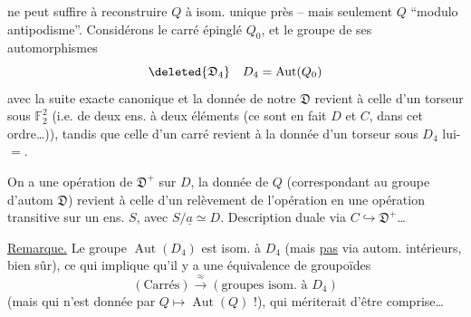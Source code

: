 ne peut suffire à reconstruire $Q$ à isom. unique près -- mais seulement $Q$ ``modulo antipodisme''. Considérons le carré épinglé $Q_0$, et le groupe de ses automorphismes
\[
\deleted{\mathfrak{D}_4}\quad D_4=\operatorname{Aut}(Q_0)
\]
avec la suite exacte canonique
et la donnée de notre $\mathfrak{D}$ revient à celle d'un torseur sous $\mathbb{F}_2^2$  (i.e. de deux ens. à deux éléments (ce sont en fait $D$ et $C$, dans cet ordre\ldots)), tandis que celle d'un carré revient à la donnée d'un torseur sous $D_4$ lui-$=$.

On a une opération  de $\mathfrak{D}^+$ sur $D$, la donnée de $Q$ (correspondant au groupe d'autom $\mathfrak{D}$)  revient à celle d'un relèvement de  l'opération  en  une opération  transitive sur un ens. $S$,  avec $S/\underline{a}\simeq D$.
Description duale via $C\hookrightarrow\mathfrak{D}^+$\ldots

\uline{Remarque.} Le groupe $\operatorname{Aut}(D_4)$ est isom. à $D_4$ (mais \uline{pas} via autom. intérieurs, bien sûr), ce qui implique qu'il y a  une équivalence de groupoïdes
\[
(\text{Carrés})\xrightarrow{\approx}(\text{groupes isom. à }D_4)
\]
(mais qui n'est \unsure{$\not=$} donnée par  $Q\mapsto\operatorname{Aut}(Q)$ !), qui mériterait d'être comprise\ldots

